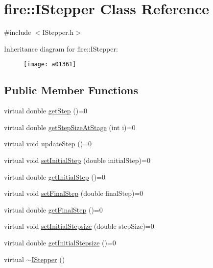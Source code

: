 \hypertarget{a01361}{}\section{fire\+:\+:I\+Stepper Class Reference}
\label{a01361}


{\ttfamily \#include $<$I\+Stepper.\+h$>$}

Inheritance diagram for fire\+:\+:I\+Stepper\+:\begin{figure}[H]
\begin{center}
\leavevmode
\texttt{[image: a01361]}
\end{center}
\end{figure}
\subsection*{Public Member Functions}
\begin{DoxyCompactItemize}
\item 
virtual double \hyperlink{a01361_a7f709d1462a2a3b8bd8214cc681ca26e}{get\+Step} ()=0
\item 
virtual double \hyperlink{a01361_a43027c0c268afcd59db8815c2e2c41ea}{get\+Step\+Size\+At\+Stage} (int i)=0
\item 
virtual void \hyperlink{a01361_a44dfccb90ee5ef6e080b54113c215458}{update\+Step} ()=0
\item 
virtual void \hyperlink{a01361_a3a5099cd0f3c874e56c33cb8f13b8f3b}{set\+Initial\+Step} (double initial\+Step)=0
\item 
virtual double \hyperlink{a01361_a49df3a2ac05cebaf2baf387b66d19272}{get\+Initial\+Step} ()=0
\item 
virtual void \hyperlink{a01361_add76974a7b6fbbc93916270a376c461e}{set\+Final\+Step} (double final\+Step)=0
\item 
virtual double \hyperlink{a01361_ab234d9f032e02668aededf1c22e8c0a9}{get\+Final\+Step} ()=0
\item 
virtual void \hyperlink{a01361_a69c262f248511efcd271be1724a41ad9}{set\+Initial\+Stepsize} (double step\+Size)=0
\item 
virtual double \hyperlink{a01361_afb777e62386b25e5a38d59af54972690}{get\+Initial\+Stepsize} ()=0
\item 
virtual \hyperlink{a01361_ac8ec460d35512e2e039396d5192eb57e}{$\sim$\+I\+Stepper} ()
\end{DoxyCompactItemize}


